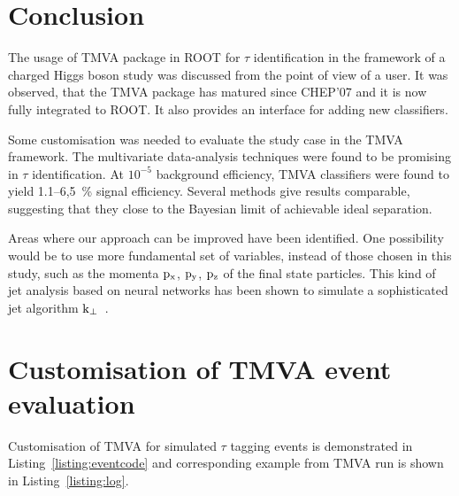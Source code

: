 \documentclass[a4paper]{jpconf}
\begin{document}
\section{Conclusion}
The usage of TMVA package in ROOT for $\tau$ identification in the
framework of a charged Higgs boson study was discussed from the
point of view of a user. It was observed, that the TMVA package has
matured since CHEP'07 and it is now fully integrated to ROOT. It also
provides an interface for adding new classifiers.

Some customisation was needed to evaluate the study case in the TMVA
framework. The multivariate data-analysis techniques were found to
be promising in $\tau$ identification.
At $10^{-5}$ background efficiency, TMVA classifiers were found to
yield 1.1--6,5~\% signal efficiency. 
Several methods give results comparable, suggesting that they close to the Bayesian limit
of achievable ideal separation.

Areas where our approach can be improved have been identified.
One possibility would be to use more fundamental set of variables, 
instead of those chosen in this study, 
such as the momenta ${\rm p_x}$, ${\rm p_y}$, ${\rm p_z}$ of the final state particles. 
This kind of jet analysis based on neural networks has been shown to simulate a sophisticated 
jet algorithm ${\rm k_\bot}$~\cite{jetanalysis}.



\appendix %
\section{Customisation of TMVA event evaluation}

Customisation of TMVA for simulated $\tau$ tagging events is demonstrated in 
Listing~\ref{listing:eventcode} and corresponding example from TMVA run is
shown in Listing~\ref{listing:log}.


\lstset{%
language=python,
keywordstyle=\underbar,
caption=Pseudocode for the event evaluation.,
breaklines=true,
stepnumber=99999,  %
showlines=false,
label=listing:eventcode
}


\end{document}
